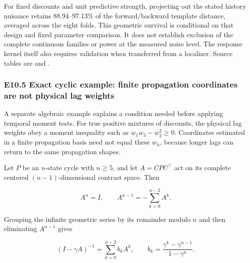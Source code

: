 \documentclass[11pt,a4paper]{article}
\begin{document}
For fixed discounts and unit predictive strength, projecting out the
stated history nuisance retains 88.94–97.13\% of the forward/backward
template distance, averaged across the eight folds. This geometric
survival is conditional on that design and fixed parameter comparison.
It does not establish exclusion of the complete continuous families or
power at the measured noise level. The response kernel itself also
requires validation when transferred from a localizer. Source tables are
 and
.

\subsubsection{E10.5 Exact cyclic example: finite propagation
coordinates are not physical lag
weights}\label{e10.5-exact-cyclic-example-finite-propagation-coordinates-are-not-physical-lag-weights}

A separate algebraic example explains a condition needed before applying
temporal moment tests. For true positive mixtures of discounts, the
physical lag weights obey a moment inequality such as
\(w_1w_3-w_2^2\geq0\). Coordinates estimated in a finite propagation
basis need not equal these \(w_h\), because longer lags can return to
the same propagation shapes.

\par
\noindent\begin{minipage}{\linewidth}

Let \(P\) be an \(n\)-state cycle with \(n\geq5\), and let
\(A=CPC^\top\) act on its complete centered \((n-1)\)-dimensional
contrast space. Then

\[
A^n=I,
\qquad A^{n-1}=-\sum_{k=0}^{n-2}A^k.
\]

\end{minipage}\par

\par
\noindent\begin{minipage}{\linewidth}

Grouping the infinite geometric series by its remainder modulo \(n\) and
then eliminating \(A^{n-1}\) gives

\[
(I-\gamma A)^{-1}
=\sum_{k=0}^{n-2}b_kA^k,
\qquad
b_k=\frac{\gamma^k-\gamma^{n-1}}{1-\gamma^n}.
\]

\end{minipage}\par
\end{document}
